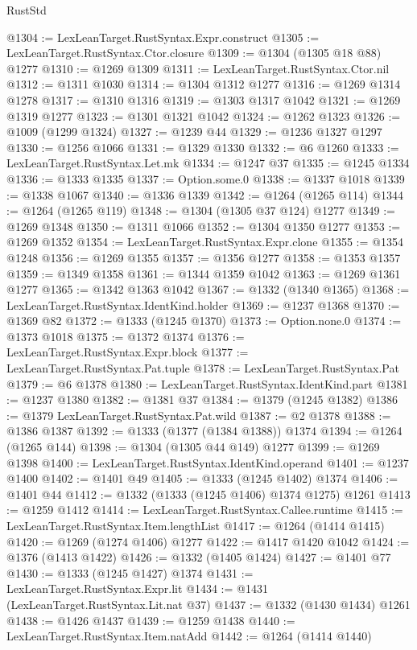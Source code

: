 \begin{lexlean}{RustStd}
\begin{coremodule}
@1304 := LexLeanTarget.RustSyntax.Expr.construct
@1305 := LexLeanTarget.RustSyntax.Ctor.closure
@1309 := @1304 (@1305 @18 @88) @1277
@1310 := @1269 @1309
@1311 := LexLeanTarget.RustSyntax.Ctor.nil
@1312 := @1311 @1030
@1314 := @1304 @1312 @1277
@1316 := @1269 @1314 @1278
@1317 := @1310 @1316
@1319 := @1303 @1317 @1042
@1321 := @1269 @1319 @1277
@1323 := @1301 @1321 @1042
@1324 := @1262 @1323
@1326 := @1009 (@1299 @1324)
@1327 := @1239 @44
@1329 := @1236 @1327 @1297
@1330 := @1256 @1066
@1331 := @1329 @1330
@1332 := @6 @1260
@1333 := LexLeanTarget.RustSyntax.Let.mk
@1334 := @1247 @37
@1335 := @1245 @1334
@1336 := @1333 @1335
@1337 := Option.some.{0}
@1338 := @1337 @1018
@1339 := @1338 @1067
@1340 := @1336 @1339
@1342 := @1264 (@1265 @114)
@1344 := @1264 (@1265 @119)
@1348 := @1304 (@1305 @37 @124) @1277
@1349 := @1269 @1348
@1350 := @1311 @1066
@1352 := @1304 @1350 @1277
@1353 := @1269 @1352
@1354 := LexLeanTarget.RustSyntax.Expr.clone
@1355 := @1354 @1248
@1356 := @1269 @1355
@1357 := @1356 @1277
@1358 := @1353 @1357
@1359 := @1349 @1358
@1361 := @1344 @1359 @1042
@1363 := @1269 @1361 @1277
@1365 := @1342 @1363 @1042
@1367 := @1332 (@1340 @1365)
@1368 := LexLeanTarget.RustSyntax.IdentKind.holder
@1369 := @1237 @1368
@1370 := @1369 @82
@1372 := @1333 (@1245 @1370)
@1373 := Option.none.{0}
@1374 := @1373 @1018
@1375 := @1372 @1374
@1376 := LexLeanTarget.RustSyntax.Expr.block
@1377 := LexLeanTarget.RustSyntax.Pat.tuple
@1378 := LexLeanTarget.RustSyntax.Pat
@1379 := @6 @1378
@1380 := LexLeanTarget.RustSyntax.IdentKind.part
@1381 := @1237 @1380
@1382 := @1381 @37
@1384 := @1379 (@1245 @1382)
@1386 := @1379 LexLeanTarget.RustSyntax.Pat.wild
@1387 := @2 @1378
@1388 := @1386 @1387
@1392 := @1333 (@1377 (@1384 @1388)) @1374
@1394 := @1264 (@1265 @144)
@1398 := @1304 (@1305 @44 @149) @1277
@1399 := @1269 @1398
@1400 := LexLeanTarget.RustSyntax.IdentKind.operand
@1401 := @1237 @1400
@1402 := @1401 @49
@1405 := @1333 (@1245 @1402) @1374
@1406 := @1401 @44
@1412 := @1332 (@1333 (@1245 @1406) @1374 @1275) @1261
@1413 := @1259 @1412
@1414 := LexLeanTarget.RustSyntax.Callee.runtime
@1415 := LexLeanTarget.RustSyntax.Item.lengthList
@1417 := @1264 (@1414 @1415)
@1420 := @1269 (@1274 @1406) @1277
@1422 := @1417 @1420 @1042
@1424 := @1376 (@1413 @1422)
@1426 := @1332 (@1405 @1424)
@1427 := @1401 @77
@1430 := @1333 (@1245 @1427) @1374
@1431 := LexLeanTarget.RustSyntax.Expr.lit
@1434 := @1431 (LexLeanTarget.RustSyntax.Lit.nat @37)
@1437 := @1332 (@1430 @1434) @1261
@1438 := @1426 @1437
@1439 := @1259 @1438
@1440 := LexLeanTarget.RustSyntax.Item.natAdd
@1442 := @1264 (@1414 @1440)

\end{coremodule}
\end{lexlean}
